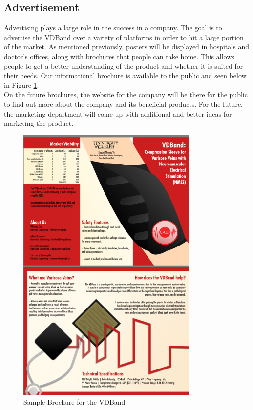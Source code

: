 \documentclass[11.5pt]{article}
\begin{document}
\subsection{Advertisement}
Advertising plays a large role in the success in a company. The goal is to advertise the VDBand over a variety of platforms in order to hit a large portion of the market. As mentioned previously, posters will be displayed in hospitals and doctor’s offices, along with brochures that people can take home. This allows people to get a better understanding of the product and whether it is suited for their needs. Our informational brochure is available to the public and seen below in Figure \ref{fig:brochure}.\\

On the future brochures, the website for the company will be there for the public to find out more about the company and its beneficial products. For the future, the marketing department will come up with additional and better ideas for marketing the product. 

\begin{figure}[H]
    \centering
    \includegraphics[width=0.8\textwidth]{marketing/brochure.png}
    \caption{Sample Brochure for the VDBand}
    \label{fig:brochure}
\end{figure}
\end{document}
